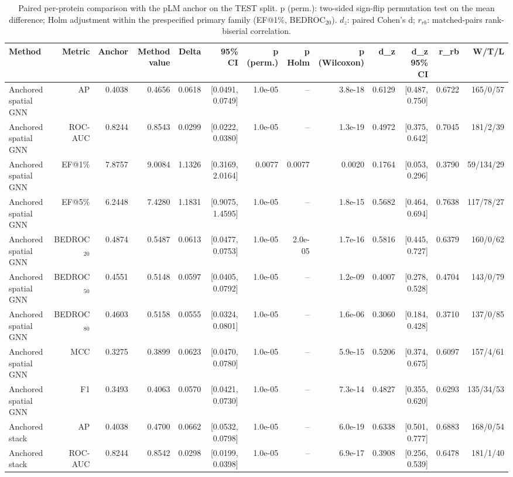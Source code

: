\begin{table}[t]
\centering
\small
\caption{Paired per-protein comparison with the pLM anchor on the TEST split. p (perm.): two-sided sign-flip permutation test on the mean difference; Holm adjustment within the prespecified primary family (EF@1\%, BEDROC$_{20}$). $d_z$: paired Cohen's d; $r_{rb}$: matched-pairs rank-biserial correlation.}
\label{tab:table2_paired_vs_anchor_test}
\begin{tabular}{lrrrrrrrrrrrr}
\toprule
Method & Metric & Anchor & Method value & Delta & 95\% CI & p (perm.) & p Holm & p (Wilcoxon) & d\_z & d\_z 95\% CI & r\_rb & W/T/L \\
\midrule
Anchored spatial GNN & AP & 0.4038 & 0.4656 & 0.0618 & [0.0491, 0.0749] & 1.0e-05 & -- & 3.8e-18 & 0.6129 & [0.487, 0.750] & 0.6722 & 165/0/57 \\
Anchored spatial GNN & ROC-AUC & 0.8244 & 0.8543 & 0.0299 & [0.0222, 0.0380] & 1.0e-05 & -- & 1.3e-19 & 0.4972 & [0.375, 0.642] & 0.7045 & 181/2/39 \\
Anchored spatial GNN & EF@1\% & 7.8757 & 9.0084 & 1.1326 & [0.3169, 2.0164] & 0.0077 & 0.0077 & 0.0020 & 0.1764 & [0.053, 0.296] & 0.3790 & 59/134/29 \\
Anchored spatial GNN & EF@5\% & 6.2448 & 7.4280 & 1.1831 & [0.9075, 1.4595] & 1.0e-05 & -- & 1.8e-15 & 0.5682 & [0.464, 0.694] & 0.7638 & 117/78/27 \\
Anchored spatial GNN & BEDROC$_{20}$ & 0.4874 & 0.5487 & 0.0613 & [0.0477, 0.0753] & 1.0e-05 & 2.0e-05 & 1.7e-16 & 0.5816 & [0.445, 0.727] & 0.6379 & 160/0/62 \\
Anchored spatial GNN & BEDROC$_{50}$ & 0.4551 & 0.5148 & 0.0597 & [0.0405, 0.0792] & 1.0e-05 & -- & 1.2e-09 & 0.4007 & [0.278, 0.528] & 0.4704 & 143/0/79 \\
Anchored spatial GNN & BEDROC$_{80}$ & 0.4603 & 0.5158 & 0.0555 & [0.0324, 0.0801] & 1.0e-05 & -- & 1.6e-06 & 0.3060 & [0.184, 0.428] & 0.3710 & 137/0/85 \\
Anchored spatial GNN & MCC & 0.3275 & 0.3899 & 0.0623 & [0.0470, 0.0780] & 1.0e-05 & -- & 5.9e-15 & 0.5206 & [0.374, 0.675] & 0.6097 & 157/4/61 \\
Anchored spatial GNN & F1 & 0.3493 & 0.4063 & 0.0570 & [0.0421, 0.0730] & 1.0e-05 & -- & 7.3e-14 & 0.4827 & [0.355, 0.620] & 0.6293 & 135/34/53 \\
Anchored stack & AP & 0.4038 & 0.4700 & 0.0662 & [0.0532, 0.0798] & 1.0e-05 & -- & 6.0e-19 & 0.6338 & [0.501, 0.777] & 0.6883 & 168/0/54 \\
Anchored stack & ROC-AUC & 0.8244 & 0.8542 & 0.0298 & [0.0199, 0.0398] & 1.0e-05 & -- & 6.9e-17 & 0.3908 & [0.256, 0.539] & 0.6478 & 181/1/40 \\

\end{tabular}
\end{table}
